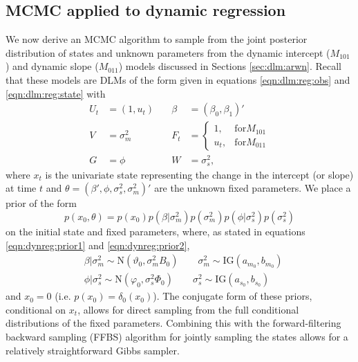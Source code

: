 \subsection{MCMC applied to dynamic regression \label{sec:mcmc:dr}}

We now derive an MCMC algorithm to sample from the joint posterior distribution of states and unknown parameters from the dynamic intercept ($M_{101}$) and dynamic slope ($M_{011}$) models discussed in Sections \ref{sec:dlm:arwn}. Recall that these models are DLMs of the form given in equations \eqref{eqn:dlm:reg:obs} and \eqref{eqn:dlm:reg:state} with
\begin{align*}
U_t &= (1, u_t) &\quad \beta &= (\beta_0, \beta_1)' \\
V &= \sigma^2_m &\quad F_t &= \left\{\begin{array}{ll} 1, & \mbox{for} M_{101} \\ u_t, & \mbox{for} M_{011} \end{array}\right. \\
G &= \phi &\quad W &= \sigma^2_s,
\end{align*}
where $x_t$ is the univariate state representing the change in the intercept (or slope) at time $t$ and $\theta = (\beta',\phi,\sigma^2_s,\sigma^2_m)'$ are the unknown fixed parameters. We place a prior of the form
\begin{equation}
p(x_0, \theta) = p(x_0)p(\beta|\sigma^2_m)p(\sigma^2_m)p(\phi|\sigma^2_s)p(\sigma^2_s) \label{eqn:dr:prior}
\end{equation}
on the initial state and fixed parameters, where, as stated in equations \eqref{eqn:dynreg:prior1} and \eqref{eqn:dynreg:prior2},
\begin{align*}
&\beta|\sigma^2_m \sim \mbox{N}(\vartheta_0, \sigma^2_mB_0) \qquad \sigma^2_m \sim \mbox{IG}(a_{m_0}, b_{m_0}) \\
&\phi|\sigma^2_s \sim \mbox{N}(\varphi_0, \sigma^2_s\Phi_0) \qquad \sigma^2_s \sim \mbox{IG}(a_{s_0}, b_{s_0})
\end{align*}
and $x_0 = 0$ (i.e. $p(x_0) = \delta_0(x_0)$). The conjugate form of these priors, conditional on $x_t$, allows for direct sampling from the full conditional distributions of the fixed parameters. Combining this with the forward-filtering backward sampling (FFBS) algorithm for jointly sampling the states \citep{Cart:Kohn:on:1994} allows for a relatively straightforward Gibbs sampler.

